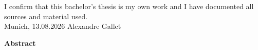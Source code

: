 \documentclass[11pt,
               a4paper,
               bibtotoc,
               idxtotoc,
               headsepline,
               footsepline,
               footexclude,
               BCOR12mm,
               DIV13,
               openany,   %
               ]
               {scrbook}
\def\doctype{Bachelor's Thesis\xspace}
\def\author{Alexandre Gallet}
\def\date{13.08.2026}
\begin{document}
\addtolength{\hoffset}{\bcorcor}
\newpage


\clearpage

\thispagestyle{empty}
\vspace*{0.7\textheight}
\noindent
I confirm that this \MakeLowercase{\doctype} is my own work and I have documented all sources and material used.\\

\vspace{15mm}
\noindent
Munich, \date \hspace{5cm} \author
\clearpage


{}
\vspace*{2cm}
\begin{center}
    {\Large \bf Abstract}
\end{center}
\vspace{1cm}

\lipsum[2] %

\clearpage



\tableofcontents
\thispagestyle{empty}
\clearpage


\mainmatter









\appendix


\backmatter

\listoffigures

\listoftables



\end{document}
